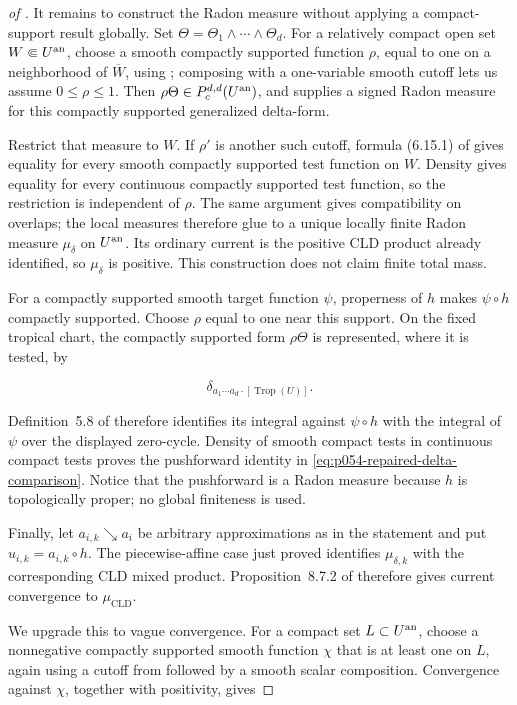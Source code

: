 \begin{proof}[of
]
It remains to construct the Radon measure without applying a compact-support
result globally.  Set \(\Theta=\Theta_1\wedge\cdots\wedge\Theta_d\).  For a
relatively compact open set \(W\Subset U^{\mathrm{an}}\), choose a smooth compactly
supported function \(\rho\), equal to one on a neighborhood of
\(\overline W\), using \cite[Corollary~6.2.4]{CLD25}; composing with a
one-variable smooth cutoff lets us assume \(0\leq\rho\leq1\).  Then
\(\rho\Theta\in P_c^{d,d}(U^{\mathrm{an}})\), and
\cite[Corollary~6.15]{GK17} supplies a signed Radon measure for this compactly
supported generalized delta-form.

Restrict that measure to \(W\).  If \(\rho'\) is another such cutoff, formula
(6.15.1) of \cite{GK17} gives equality for every smooth compactly supported
test function on \(W\).  Density
\cite[Theorem~6.2.5 and Corollary~6.2.6]{CLD25} gives equality for every
continuous compactly supported test function, so the restriction is
independent of \(\rho\).  The same argument gives compatibility on overlaps;
the local measures therefore glue to a unique locally finite Radon measure
\(\mu_\delta\) on \(U^{\mathrm{an}}\).  Its ordinary current is the positive CLD
product already identified, so \(\mu_\delta\) is positive.  This construction
does not claim finite total mass.

For a compactly supported smooth target function \(\psi\), properness of
\(h\) makes \(\psi\circ h\) compactly supported.  Choose \(\rho\) equal to
one near this support.  On the fixed tropical chart, the compactly supported
form \(\rho\Theta\) is represented, where it is tested, by

\[
 \delta_{a_1\cdots a_d\cdot[\operatorname{Trop}(U)]}.
\]

Definition~5.8 of \cite{GK17} therefore identifies its integral against
\(\psi\circ h\) with the integral of \(\psi\) over the displayed zero-cycle.
Density of smooth compact tests in continuous compact tests proves the
pushforward identity in \eqref{eq:p054-repaired-delta-comparison}.  Notice
that the pushforward is a Radon measure because \(h\) is topologically
proper; no global finiteness is used.

Finally, let \(a_{i,k}\searrow a_i\) be arbitrary approximations as in the
statement and put \(u_{i,k}=a_{i,k}\circ h\).  The piecewise-affine case just
proved identifies \(\mu_{\delta,k}\) with the corresponding CLD mixed
product.  Proposition~8.7.2 of \cite{CLD25} therefore gives current
convergence to \(\mu_{\mathrm{CLD}}\).

We upgrade this to vague convergence.  For a compact set
\(L\subset U^{\mathrm{an}}\), choose a nonnegative compactly supported smooth
function \(\chi\) that is at least one on \(L\), again using a cutoff from
\cite[Corollary~6.2.4]{CLD25} followed by a smooth scalar composition.
Convergence against \(\chi\), together with positivity, gives


\end{proof}

